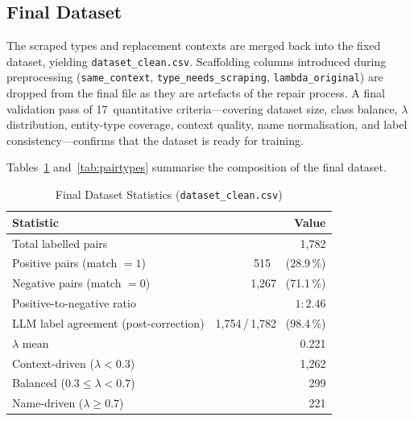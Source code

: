 \subsection{Final Dataset}
\label{sec:final_dataset}

The scraped types and replacement contexts are merged back into the
fixed dataset, yielding \texttt{dataset\_clean.csv}. Scaffolding
columns introduced during preprocessing (\texttt{same\_context},
\texttt{type\_needs\_scraping}, \texttt{lambda\_original}) are dropped
from the final file as they are artefacts of the repair process.
A final validation pass of 17~quantitative criteria---covering dataset
size, class balance, $\lambda$ distribution, entity-type coverage,
context quality, name normalisation, and label consistency---confirms
that the dataset is ready for training.

Tables~\ref{tab:dataset_stats} and~\ref{tab:pairtypes} summarise the
composition of the final dataset.

\begin{table}[h]
\caption{Final Dataset Statistics (\texttt{dataset\_clean.csv})}
\label{tab:dataset_stats}
\centering
\begin{tabular}{lr}
\toprule
\textbf{Statistic} & \textbf{Value} \\
\midrule
Total labelled pairs                          & 1{,}782 \\
Positive pairs (match $= 1$)                  & 515 \ \ (28.9\,\%) \\
Negative pairs (match $= 0$)                  & 1{,}267 \ (71.1\,\%) \\
Positive-to-negative ratio                    & $1\!:\!2.46$ \\
\midrule
LLM label agreement (post-correction)         & 1{,}754\,/\,1{,}782 \ (98.4\,\%) \\
\midrule
$\lambda$ mean                                & 0.221 \\
Context-driven ($\lambda < 0.3$)              & 1{,}262 \\
Balanced ($0.3 \le \lambda < 0.7$)            & 299 \\
Name-driven ($\lambda \ge 0.7$)               & 221 \\
\bottomrule
\end{tabular}
\end{table}


